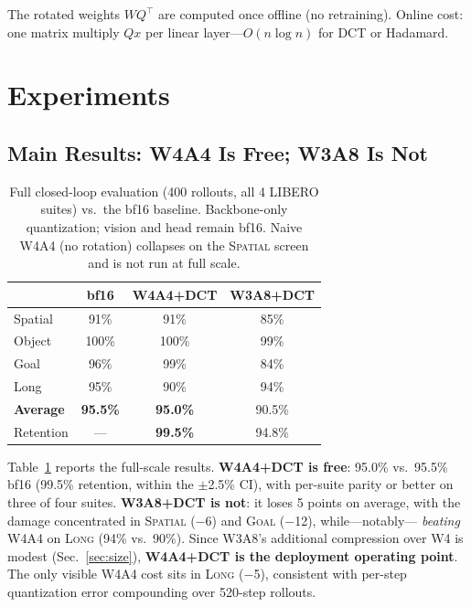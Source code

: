 \documentclass[conference]{IEEEtran}
\begin{document}
The rotated weights $WQ^\top$ are computed once offline (no retraining). Online cost: one
matrix multiply $Qx$ per linear layer---$O(n\log n)$ for DCT or Hadamard.

\section{Experiments}
\label{sec:experiments}

\subsection{Main Results: W4A4 Is Free; W3A8 Is Not}
\label{sec:mainresults}

\begin{table}[t]\centering\small
\caption{Full closed-loop evaluation (400 rollouts, all 4 LIBERO suites) vs.\ the bf16
baseline. Backbone-only quantization; vision and head remain bf16. Naive W4A4 (no
rotation) collapses on the \textsc{Spatial} screen and is not run at full scale.}
\label{tab:main}
\begin{tabular}{lccc}
\toprule
 & bf16 & W4A4+DCT & W3A8+DCT \\
\midrule
Spatial & 91\% & 91\% & 85\% \\
Object  & 100\% & 100\% & 99\% \\
Goal    & 96\% & 99\% & 84\% \\
Long    & 95\% & 90\% & 94\% \\
\midrule
\textbf{Average} & \textbf{95.5\%} & \textbf{95.0\%} & 90.5\% \\
Retention & --- & \textbf{99.5\%} & 94.8\% \\
\bottomrule
\end{tabular}
\end{table}

Table~\ref{tab:main} reports the full-scale results. \textbf{W4A4+DCT is free}: 95.0\% vs.\
95.5\% bf16 (99.5\% retention, within the $\pm$2.5\% CI), with per-suite parity or better
on three of four suites. \textbf{W3A8+DCT is not}: it loses 5 points on average, with the
damage concentrated in \textsc{Spatial} ($-$6) and \textsc{Goal} ($-$12), while---notably---%
\emph{beating} W4A4 on \textsc{Long} (94\% vs.\ 90\%). Since W3A8's additional compression
over W4 is modest (Sec.~\ref{sec:size}), \textbf{W4A4+DCT is the deployment operating
point}. The only visible W4A4 cost sits in \textsc{Long} ($-$5), consistent with per-step
quantization error compounding over 520-step rollouts.
\end{document}
